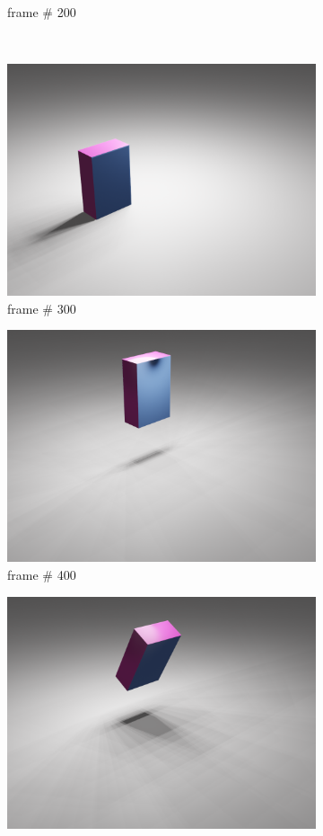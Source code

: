 \begin{figure}[ht]
\begin{subfigure}{.31\textwidth}
  \caption{frame \# 200}
\end{subfigure} 
\\
\begin{subfigure}{.31\textwidth}
  \centering
  \includegraphics[width=.8\linewidth]{0300.png}  
  \caption{frame \# 300}
\end{subfigure}
\hfill
\begin{subfigure}{.31\textwidth}
  \centering
  \includegraphics[width=.8\linewidth]{0400.png}  
  \caption{frame \# 400}
\end{subfigure}
\hfill
\begin{subfigure}{.31\textwidth}
  \centering
  \includegraphics[width=.8\linewidth]{0500.png}  

\end{subfigure}
\end{figure}
